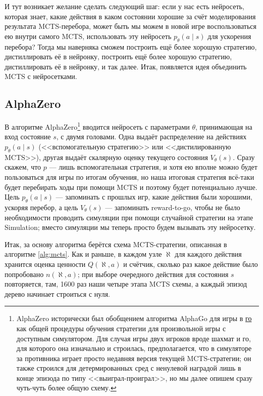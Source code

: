 И тут возникает желание сделать следующий шаг: если у нас есть нейросеть, которая знает, какие действия в каком состоянии хорошие за счёт моделирования результата MCTS-перебора, может быть мы можем в новой игре воспользоваться ею внутри самого MCTS, использовать эту нейросеть $p_{\theta}(a \mid s)$ для ускорения перебора? Тогда мы наверняка сможем построить ещё более хорошую стратегию, дистиллировать её в нейронку, построить ещё более хорошую стратегию, дистиллировать её в нейронку, и так далее. Итак, появляется идея объединить MCTS с нейросетками.

\subsection{AlphaZero}

В алгоритме AlphaZero\footnote{AlphaZero исторически был обобщением алгоритма AlphaGo для игры в \href{https://ru.wikipedia.org/wiki/Го}{го} как общей процедуры обучения стратегии для произвольной игры с доступным симулятором. Для случая игры двух игроков вроде шахмат и го, для которого она изначально и строилась, предполагается, что в симуляторе за противника играет просто недавняя версия текущей MCTS-стратегии; он также строился для детермированных сред с ненулевой наградой лишь в конце эпизода по типу <<выиграл-проиграл>>, но мы далее опишем сразу чуть-чуть более общую схему.} вводится нейросеть с параметрами $\theta$, принимающая на вход состояние $s$, с двумя головами. Одна выдаёт распределение на действиях $p_{\theta}(a \mid s)$ (<<вспомогательную стратегию>> или <<дистилированную MCTS>>), другая выдаёт скалярную оценку текущего состояния $V_\theta(s)$. Сразу скажем, что $p$ --- лишь вспомогательная стратегия, и хотя ею вполне можно будет пользоваться для игры по итогам обучения, но наша итоговая стратегия всё-таки будет перебирать ходы при помощи MCTS и поэтому будет потенциально лучше. Цель $p_{\theta}(a \mid s)$ --- запоминать с прошлых игр, какие действия были хорошими, ускоряя перебор, а цель $V_{\theta}(s)$ --- запоминать reward-to-go, чтобы не было необходимости проводить симуляции при помощи случайной стратегии на этапе Simulation; вместо симуляции мы теперь просто будем вызывать эту нейросетку.

Итак, за основу алгоритма берётся схема MCTS-стратегии, описанная в алгоритме \ref{alg:mcts}. Как и раньше, в каждом узле $\aleph$ для каждого действия хранится оценка ценности $Q(\aleph, a)$ и счётчик, сколько раз какое действие было попробовано $n(\aleph, a)$; при выборе очередного действия для состояния $s$ повторяется, там, 1600 раз наши четыре этапа MCTS схемы, а каждый эпизод дерево начинает строиться с нуля. 


